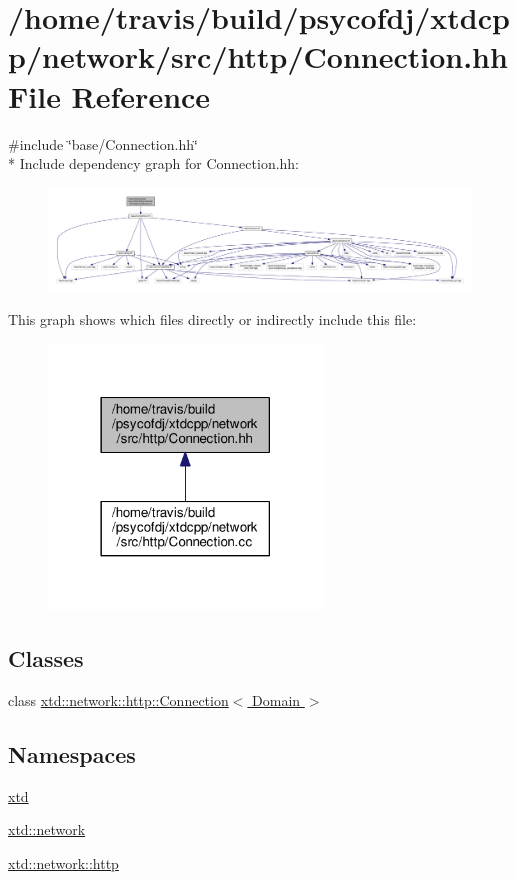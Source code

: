 \hypertarget{http_2Connection_8hh}{\section{/home/travis/build/psycofdj/xtdcpp/network/src/http/\-Connection.hh File Reference}
\label{http_2Connection_8hh}
}
{\ttfamily \#include \char`\"{}base/\-Connection.\-hh\char`\"{}}\\*
Include dependency graph for Connection.\-hh\-:
\nopagebreak
\begin{figure}[H]
\begin{center}
\leavevmode
\includegraphics[width=350pt]{http_2Connection_8hh__incl}
\end{center}
\end{figure}
This graph shows which files directly or indirectly include this file\-:
\nopagebreak
\begin{figure}[H]
\begin{center}
\leavevmode
\includegraphics[width=206pt]{http_2Connection_8hh__dep__incl}
\end{center}
\end{figure}
\subsection*{Classes}
\begin{DoxyCompactItemize}
\item 
class \hyperlink{classxtd_1_1network_1_1http_1_1Connection}{xtd\-::network\-::http\-::\-Connection$<$ Domain $>$}
\end{DoxyCompactItemize}
\subsection*{Namespaces}
\begin{DoxyCompactItemize}
\item 
\hyperlink{namespacextd}{xtd}
\item 
\hyperlink{namespacextd_1_1network}{xtd\-::network}
\item 
\hyperlink{namespacextd_1_1network_1_1http}{xtd\-::network\-::http}
\end{DoxyCompactItemize}
